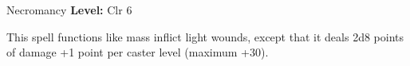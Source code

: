 {Necromancy}
{
	\textbf{Level:}
	Clr 6\\
}
{
	This spell functions like mass inflict light wounds, except that it deals 2d8 points of damage +1 point per caster level (maximum +30).

}

